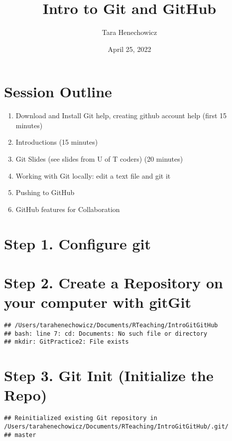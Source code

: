 \documentclass[]{article}
\title{Intro to Git and GitHub}
\author{Tara Henechowicz}
\date{April 25, 2022}
\providecommand{\tightlist}{%
  \setlength{\itemsep}{0pt}\setlength{\parskip}{0pt}}
\begin{document}
\maketitle

\section{Session Outline}\label{session-outline}

\begin{enumerate}
\def\labelenumi{\arabic{enumi}.}
\tightlist
\item
  Download and Install Git help, creating github account help (first 15
  minutes)
\item
  Introductions (15 minutes)
\item
  Git Slides (see slides from U of T coders) (20 minutes)
\item
  Working with Git locally: edit a text file and git it
\item
  Pushing to GitHub
\item
  GitHub features for Collaboration
\end{enumerate}

\section{Step 1. Configure git}\label{step-1.-configure-git}

\section{Step 2. Create a Repository on your computer with
gitGit}\label{step-2.-create-a-repository-on-your-computer-with-gitgit}

\begin{verbatim}
## /Users/tarahenechowicz/Documents/RTeaching/IntroGitGitHub
## bash: line 7: cd: Documents: No such file or directory
## mkdir: GitPractice2: File exists
\end{verbatim}

\section{Step 3. Git Init (Initialize the
Repo)}\label{step-3.-git-init-initialize-the-repo}

\begin{verbatim}
## Reinitialized existing Git repository in /Users/tarahenechowicz/Documents/RTeaching/IntroGitGitHub/.git/
## master
\end{verbatim}
\end{document}
